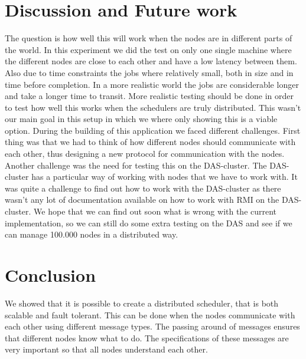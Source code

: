 \documentclass[twocolumn,a4paper]{article}
\begin{document}
\section{Discussion and Future work}
The question is how well this will work when the nodes are in different parts of the world. In this experiment we did the test on only one single machine where the different nodes are close to each other and have a low latency between them. Also due to time constraints the jobs where relatively small, both in size and in time before completion. In a more realistic world the jobs are considerable longer and take a longer time to transit. More realistic testing should be done in order to test how well this works when the schedulers are truly distributed. This wasn't our main goal in this setup in which we where only showing this is a viable option.
During the building of this application we faced different challenges. First thing was that we had to think of how different nodes should communicate with each other, thus designing a new protocol for communication with the nodes. Another challenge was the need for testing this on the DAS-cluster. The DAS-cluster has a particular way of working with nodes that we have to work with. It was quite a challenge to find out how to work with the DAS-cluster as there wasn't any lot of documentation available on how to work with RMI on the DAS-cluster.
We hope that we can find out soon what is wrong with the current implementation, so we can still do some extra testing on the DAS and see if we can manage 100.000 nodes in a distributed way.

\section{Conclusion}
We showed that it is possible to create a distributed scheduler, that is both scalable and fault tolerant. This can be done when the nodes communicate with each other using different message types. The passing around of messages ensures that different nodes know what to do. The specifications of these messages are very important so that all nodes understand each other. 
\end{document}
